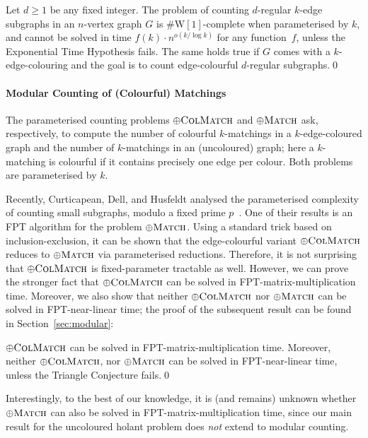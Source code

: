 \documentclass[authorcolumns,numberwithinsect]{no-lipics-v2022}
\newcommand{\W}{\mathrm{W}}
\begin{document}
\begin{corollary}
    Let $d\geq 1$ be any fixed integer. The problem of counting $d$-regular $k$-edge subgraphs in an $n$-vertex graph $G$ is $\#\W[1]$-complete when parameterised by $k$, and cannot be solved in time $f(k)\cdot n^{o(k/\log k)}$ for any function~$f$, unless the Exponential Time Hypothesis fails. The same holds true if $G$ comes with a $k$-edge-colouring and the goal is to count edge-colourful $d$-regular subgraphs.\qed
\end{corollary}


\paragraph*{Modular Counting of (Colourful) Matchings}
The parameterised counting problems $\oplus\textsc{ColMatch}$ and $\oplus\textsc{Match}$ ask, respectively, to compute the number of colourful $k$-matchings in a $k$-edge-coloured graph and the number of $k$-matchings in an (uncoloured) graph; here a $k$-matching is colourful if it contains precisely one edge per colour. Both problems are parameterised by $k$.

Recently, Curticapean, Dell, and Husfeldt analysed the parameterised complexity of counting small subgraphs, modulo a fixed prime $p$~\cite{CurticapeanDH21}. One of their results is an FPT algorithm for the problem $\oplus\textsc{Match}$. Using a standard trick based on inclusion-exclusion, it can be shown that the edge-colourful variant $\oplus\textsc{ColMatch}$ reduces to $\oplus\textsc{Match}$ via parameterised reductions. Therefore, it is not surprising that $\oplus\textsc{ColMatch}$ is fixed-parameter tractable as well. However, we can prove the stronger fact that $\oplus\textsc{ColMatch}$ can be solved in FPT-matrix-multiplication time. Moreover, we also show that neither $\oplus\textsc{ColMatch}$ nor $\oplus\textsc{Match}$ can be solved in FPT-near-linear time; the proof of the subsequent result can be found in Section~\ref{sec:modular}:
\begin{theorem}\label{thm:colmatch_mod_2_intro}
    $\oplus\textsc{ColMatch}$ can be solved in FPT-matrix-multiplication time. Moreover, neither $\oplus\textsc{ColMatch}$, nor $\oplus\textsc{Match}$ can be solved in FPT-near-linear time, unless the Triangle Conjecture fails.\qed
\end{theorem}
Interestingly, to the best of our knowledge, it is (and remains) unknown whether $\oplus\textsc{Match}$ can also be solved in FPT-matrix-multiplication time, since our main result for the uncoloured holant problem does \emph{not} extend to modular counting.
\end{document}
